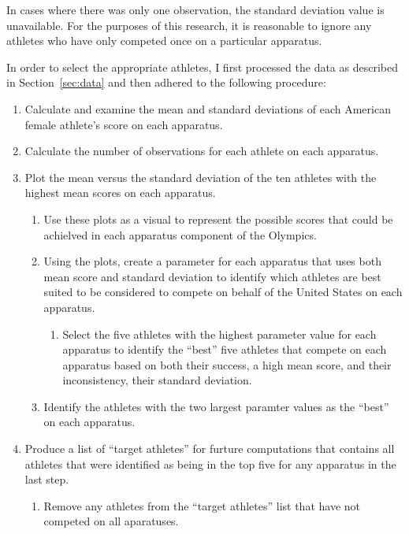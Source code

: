 \documentclass[12pt]{article}
\begin{document}
In cases where there was only one observation, the standard deviation value is unavailable.
For the purposes of this research, it is reasonable to ignore any athletes who have only competed once on a particular apparatus.

In order to select the appropriate athletes, I first processed the data as described in Section~\ref{sec:data} 
and then adhered to the following procedure:

\begin{enumerate}
  \item Calculate and examine the mean and standard deviations of each American female athlete's score 
  on each apparatus.
  \item Calculate the number of observations for each athlete on each apparatus.
  \item Plot the mean versus the standard deviation of the ten athletes with the highest mean scores on each 
  apparatus.
  \begin{enumerate}
    \item Use these plots as a visual to represent the possible scores that could be achielved in each apparatus 
    component of the Olympics.
    \item Using the plots, create a parameter for each apparatus that uses both mean score and standard 
    deviation to identify which athletes are best suited to be considered to compete on behalf of the United 
    States on each apparatus.
    \begin{enumerate}
      \item Select the five athletes with the highest parameter value for each apparatus to identify the ``best'' 
      five athletes that compete on each apparatus based on both their success, a high mean score, and their 
      inconsistency, their standard deviation.
    \end{enumerate}
    \item Identify the athletes with the two largest paramter values as the ``best'' on each apparatus.
  \end{enumerate}
  \item Produce a list of ``target athletes'' for furture computations that contains all athletes that were identified 
  as being in the top five for any apparatus in the last step.
  \begin{enumerate}
    \item Remove any athletes from the ``target athletes'' list that have not competed on all aparatuses.
  \end{enumerate}

\end{enumerate}
\end{document}

